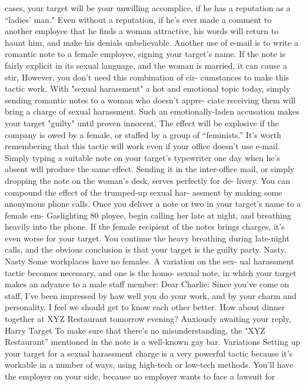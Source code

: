 \documentclass{book}
\begin{document}
cases, your target will be your unwilling accomplice, if he has a 
reputation as a “ladies’ man." Even without a reputation, if he's 
ever made a comment to another employee that he finds a 
woman attractive, his words will return to haunt him, and make 
his denials unbelievable. 
Another use of e-mail is to write a romantic note to a female 
employee, signing your target's name. If the note is fairly 
explicit in its sexual language, and the woman is married, it can 
cause a stir, However, you don't need this combination of cir- 
cumstances to make this tactic work. 
With "sexual harassment" a hot and emotional topic today, 
simply sending romantic notes to a woman who doesn't appre- 
ciate receiving them will bring a charge of sexual harassment. 
Such an emotionally-laden accusation makes your target 
"guilty" until proven innocent, The effect will be explosive if 
the company is owed by a female, or staffed by a group of 
“feminists.” 
It's worth remembering that this tactic will work even if 
your office doesn't use e-mail. Simply typing a suitable note on 
your target's typewriter one day when he's absent will produce 
the same effect. Sending it in the inter-office mail, or simply 
dropping the note on the woman's desk, serves perfectly for de- 
livery. 
You can compound the effect of the trumped-up sexual har- 
assment by making some anonymous phone calls. Once you 
deliver a note or two in your target's name to a female em-  Gaslighting 
80 
ployee, begin calling her late at night, and breathing heavily 
into the phone. If the female recipient of the notes brings 
charges, it's even worse for your target. You continue the heavy 
breathing during late-night calls, and the obvious conclusion is 
that your target is the guilty party. 
Nasty, Nasty 
Some workplaces have no females. A variation on the sex- 
ual harassment tactic becomes necessary, and one is the homo- 
sexual note, in which your target makes an adyance to a male 
staff member: 
Dear Charlie: 
Since you've come on staff, I've been impressed by 
haw well you do your work, and by your charm and 
personality. I feel we should get to know each other 
better. How about dinner together at XYZ Restaurant 
tomorrow evening? 
Anxiously awaiting your reply, 
Harry Target 
To make sure that there's no misunderstanding, the "XYZ 
Restaurant” mentioned in the note is a well-known gay bar. 
Variations 
Setting up your target for a sexual harassment charge is a 
very powerful tactic because it's workable in a number of ways, 
using high-tech or low-tech methods. You'll have the employer 
on your side, because no employer wants to face a lawsuit for 
\end{document}
